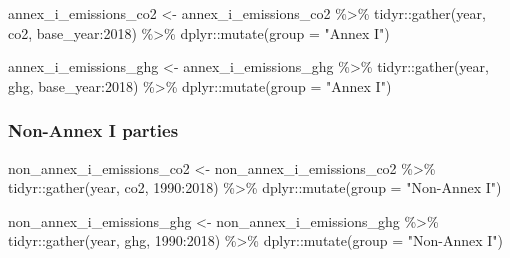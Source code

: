 \documentclass[
  12pt,
]{article}
\newenvironment{Shaded}{}{}
\newcommand{\AttributeTok}[1]{\textcolor[rgb]{0.49,0.56,0.16}{#1}}
\newcommand{\FunctionTok}[1]{\textcolor[rgb]{0.02,0.16,0.49}{#1}}
\newcommand{\NormalTok}[1]{#1}
\newcommand{\OtherTok}[1]{\textcolor[rgb]{0.00,0.44,0.13}{#1}}
\newcommand{\SpecialCharTok}[1]{\textcolor[rgb]{0.25,0.44,0.63}{#1}}
\newcommand{\StringTok}[1]{\textcolor[rgb]{0.25,0.44,0.63}{#1}}
\begin{document}
\begin{Shaded}
\begin{Highlighting}[]
\NormalTok{annex\_i\_emissions\_co2 }\OtherTok{\textless{}{-}}\NormalTok{ annex\_i\_emissions\_co2 }\SpecialCharTok{\%\textgreater{}\%}
\NormalTok{    tidyr}\SpecialCharTok{::}\FunctionTok{gather}\NormalTok{(year, co2, base\_year}\SpecialCharTok{:}\StringTok{\textasciigrave{}}\AttributeTok{2018}\StringTok{\textasciigrave{}}\NormalTok{) }\SpecialCharTok{\%\textgreater{}\%}
\NormalTok{    dplyr}\SpecialCharTok{::}\FunctionTok{mutate}\NormalTok{(}\AttributeTok{group =} \StringTok{"Annex I"}\NormalTok{)}

\NormalTok{annex\_i\_emissions\_ghg }\OtherTok{\textless{}{-}}\NormalTok{ annex\_i\_emissions\_ghg }\SpecialCharTok{\%\textgreater{}\%}
\NormalTok{    tidyr}\SpecialCharTok{::}\FunctionTok{gather}\NormalTok{(year, ghg, base\_year}\SpecialCharTok{:}\StringTok{\textasciigrave{}}\AttributeTok{2018}\StringTok{\textasciigrave{}}\NormalTok{) }\SpecialCharTok{\%\textgreater{}\%}
\NormalTok{    dplyr}\SpecialCharTok{::}\FunctionTok{mutate}\NormalTok{(}\AttributeTok{group =} \StringTok{"Annex I"}\NormalTok{)}
\end{Highlighting}
\end{Shaded}

\hypertarget{non-annex-i-parties-3}{%
\subsubsection{Non-Annex I parties}\label{non-annex-i-parties-3}}

\begin{Shaded}
\begin{Highlighting}[]
\NormalTok{non\_annex\_i\_emissions\_co2 }\OtherTok{\textless{}{-}}\NormalTok{ non\_annex\_i\_emissions\_co2 }\SpecialCharTok{\%\textgreater{}\%}
\NormalTok{    tidyr}\SpecialCharTok{::}\FunctionTok{gather}\NormalTok{(year, co2, }\StringTok{\textasciigrave{}}\AttributeTok{1990}\StringTok{\textasciigrave{}}\SpecialCharTok{:}\StringTok{\textasciigrave{}}\AttributeTok{2018}\StringTok{\textasciigrave{}}\NormalTok{) }\SpecialCharTok{\%\textgreater{}\%}
\NormalTok{    dplyr}\SpecialCharTok{::}\FunctionTok{mutate}\NormalTok{(}\AttributeTok{group =} \StringTok{"Non{-}Annex I"}\NormalTok{)}

\NormalTok{non\_annex\_i\_emissions\_ghg }\OtherTok{\textless{}{-}}\NormalTok{ non\_annex\_i\_emissions\_ghg }\SpecialCharTok{\%\textgreater{}\%}
\NormalTok{    tidyr}\SpecialCharTok{::}\FunctionTok{gather}\NormalTok{(year, ghg, }\StringTok{\textasciigrave{}}\AttributeTok{1990}\StringTok{\textasciigrave{}}\SpecialCharTok{:}\StringTok{\textasciigrave{}}\AttributeTok{2018}\StringTok{\textasciigrave{}}\NormalTok{) }\SpecialCharTok{\%\textgreater{}\%}
\NormalTok{    dplyr}\SpecialCharTok{::}\FunctionTok{mutate}\NormalTok{(}\AttributeTok{group =} \StringTok{"Non{-}Annex I"}\NormalTok{)}
\end{Highlighting}
\end{Shaded}
\end{document}
